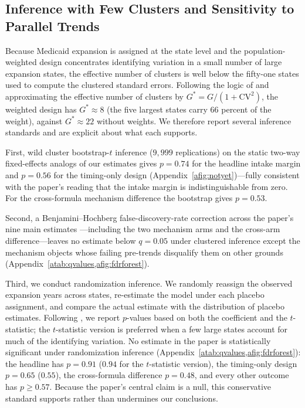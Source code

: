 \subsection{Inference with Few Clusters and Sensitivity to Parallel Trends}\label{subsec:inference}

Because Medicaid expansion is assigned at the state level and the population-weighted design concentrates identifying variation in a small number of large expansion states, the effective number of clusters is well below the fifty-one states used to compute the clustered standard errors. Following the logic of \textcite{carter2017asymptotic} and approximating the effective number of clusters by $G^{*} = G/(1 + \mathrm{CV}^2)$, the weighted design has $G^{*} \approx 8$ (the five largest states carry $66$ percent of the weight), against $G^{*} \approx 22$ without weights. We therefore report several inference standards and are explicit about what each supports.

First, wild cluster bootstrap-$t$ inference ($9{,}999$ replications) on the static two-way fixed-effects analogs of our estimates gives $p = 0.74$ for the headline intake margin and $p = 0.56$ for the timing-only design (Appendix~\cref{afig:notyet})---fully consistent with the paper's reading that the intake margin is indistinguishable from zero. For the cross-formula mechanism difference the bootstrap gives $p = 0.53$.

Second, a Benjamini--Hochberg false-discovery-rate correction across the paper's nine main estimates \autocite{benjamini1995controlling}---including the two mechanism arms and the cross-arm difference---leaves no estimate below $q = 0.05$ under clustered inference except the mechanism objects whose failing pre-trends disqualify them on other grounds (Appendix~\cref{atab:qvalues,afig:fdrforest}).

Third, we conduct randomization inference. We randomly reassign the observed expansion years across states, re-estimate the model under each placebo assignment, and compare the actual estimate with the distribution of placebo estimates. Following \textcite{young2019}, we report $p$-values based on both the coefficient and the $t$-statistic; the $t$-statistic version is preferred when a few large states account for much of the identifying variation. No estimate in the paper is statistically significant under randomization inference (Appendix~\cref{atab:qvalues,afig:fdrforest}): the headline has $p = 0.91$ ($0.94$ for the $t$-statistic version), the timing-only design $p = 0.65$ ($0.55$), the cross-formula difference $p = 0.48$, and every other outcome has $p \geq 0.57$. Because the paper's central claim is a null, this conservative standard supports rather than undermines our conclusions.

